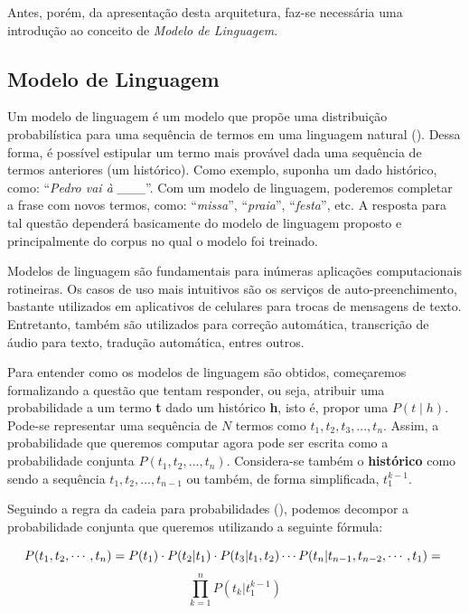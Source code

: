 Antes, porém, da apresentação desta arquitetura, faz-se necessária uma introdução ao conceito de \textit{Modelo de Linguagem}.

\subsection{Modelo de Linguagem}

Um modelo de linguagem é um modelo que propõe uma distribuição probabilística para uma sequência de termos em uma linguagem natural (\cite{Manning:1999}).
Dessa forma, é possível estipular um termo mais provável dada uma sequência de termos anteriores (um histórico). Como exemplo, suponha um dado histórico, como: “\textit{Pedro vai à \_\_\_}”. Com um modelo de linguagem, poderemos completar a frase com novos termos, como: “\textit{missa}”, “\textit{praia}”, “\textit{festa}”, etc. A resposta para tal questão dependerá basicamente do modelo de linguagem proposto e principalmente do corpus no qual o modelo foi treinado. 

Modelos de linguagem são fundamentais para inúmeras aplicações computacionais rotineiras. Os casos de uso mais intuitivos são os serviços de auto-preenchimento, bastante utilizados em aplicativos de celulares para trocas de mensagens de texto. Entretanto, também são utilizados para correção automática, transcrição de áudio para texto,  tradução automática, entres outros.  

Para entender como os modelos de linguagem são obtidos, começaremos formalizando a questão que tentam responder, ou seja, atribuir uma probabilidade a um termo \textbf{t} dado um histórico \textbf{h}, isto é, propor uma $P(t \mid h)$. Pode-se representar uma sequência de $N$ termos como $t_1, t_2, t_3, ..., t_n$. Assim, a probabilidade que queremos computar agora pode ser escrita como a probabilidade conjunta $P(t_1, t_2, ..., t_n)$. Considera-se também o \textbf{histórico} como sendo a sequência $t_1, t_2, ..., t_{n-1}$ ou também, de forma simplificada, $t_{1}^{k-1}$. 

Seguindo a regra da cadeia para probabilidades (\cite{Jurafsky:2009:SLP:1214993}), podemos decompor a probabilidade conjunta que queremos utilizando a seguinte fórmula:

\begin{equation}
\label{eq:cadeia}
	P(t_1, t_2, \cdots, t_n) = P(t_1)\cdot P(t_2|t_1)\cdot P(t_3|t_1, t_2) \cdots P(t_n|t_{n-1},t_{n-2}, \cdots, t_1) =\notag\\ 
\end{equation}
\begin{equation}
	\prod_{k=1}^{n} P(t_{k}|t_{1}^{k-1})
\end{equation}

